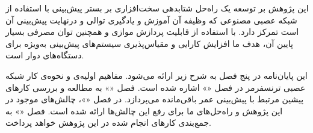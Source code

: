 
این پژوهش بر توسعه یک راه‌حل شتابدهی سخت‌افزاری بر بستر  پیش‌بینی   با استفاده از شبکه عصبی مصنوعی که وظیفه آن آموزش و یادگیری توالی و درنهایت پیش‌بینی آن است تمرکز دارد. با استفاده از قابلیت پردازش موازی  و همچنین توان مصرفی بسیار پایین آن، هدف ما افزایش کارایی و مقیاس‌پذیری سیستم‌های پیش‌بینی  به‌ویژه برای دستگاه‌های دوار است.







این پایان‌نامه در پنج فصل به شرح زیر ارائه می‌شود.
مفاهیم اولیه‌ی و نحوه‌ی کار شبکه عصبی ترنسفرمر در فصل «» اشاره شده است. 
فصل «» به مطالعه و بررسی کارهای پیشین مرتبط با پیش‌بینی عمر باقی‌مانده می‌پردازد.
در فصل «»، چالش‌های موجود در این پژوهش و راه‌حل‌های ما برای رفع این چالش‌ها ارائه شده است.
فصل «» به جمع‌بندی کارهای انجام شده در این پژوهش خواهد پرداخت.

